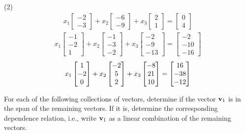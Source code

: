 \begin{tasks}[resume, style=enumerate](2)
\task
  \begin{align*}
    x_1\left[\begin{matrix}-2\\-3\end{matrix}\right] + x_{2}\left[\begin{matrix}-6\\-9\end{matrix}\right] + x_{3}\left[\begin{matrix}2\\1\end{matrix}\right]= \left[\begin{matrix}0\\4\end{matrix}\right]
  \end{align*}
\task
  \begin{align*}
    x_1\left[\begin{matrix}-1\\-2\\1\end{matrix}\right] + x_{2}\left[\begin{matrix}-1\\-3\\-2\end{matrix}\right] + x_{3}\left[\begin{matrix}-2\\-9\\-13\end{matrix}\right]= \left[\begin{matrix}-2\\-10\\-16\end{matrix}\right]
  \end{align*}
\task
  \begin{displaymath}
    x_1  \begin{bmatrix} 1 \\ -2 \\ 0 \end{bmatrix} 
    + x_2  \begin{bmatrix} -2 \\ 5 \\ 2 \end{bmatrix} 
    + x_3  \begin{bmatrix} -8 \\ 21 \\ 10 \end{bmatrix} 
    =  \begin{bmatrix} 16 \\ -38 \\ -12 \end{bmatrix} 
  \end{displaymath}
\end{tasks}
For each of the following collections of vectors, determine if the
vector $\mathbf v_1$ is in the span of the remaining vectors. If it
is, determine the corresponding dependence relation, i.e., write
$\mathbf v_1$ as a linear combination of the remaining vectors.
